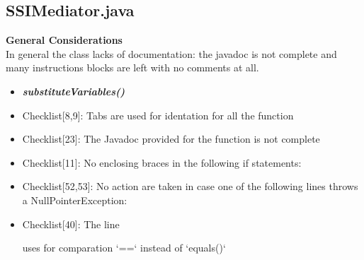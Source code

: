 \documentclass[11pt,titlepage]{article} %
\begin{document}
\subsection{SSIMediator.java}
  \textbf{General Considerations} \hfill \\
  In general the class lacks of documentation: the javadoc is not complete and many instructions blocks are left with no comments at all.
  \begin{itemize}
   \item \textbf{\textit{substituteVariables()}}
   \item Checklist[8,9]: Tabs are used for identation for all the function
   \item Checklist[23]: The Javadoc provided for the function is not complete 
   \item Checklist[11]: No enclosing braces in the following if statements:
    
    
    
    


   \item Checklist[52,53]: No action are taken in case one of the following lines throws a NullPointerException:
    
    
    
    
    
   \item Checklist[40]: The line
    
    uses for comparation `==` instead of `equals()`
  \end{itemize}
\newpage
\end{document}
